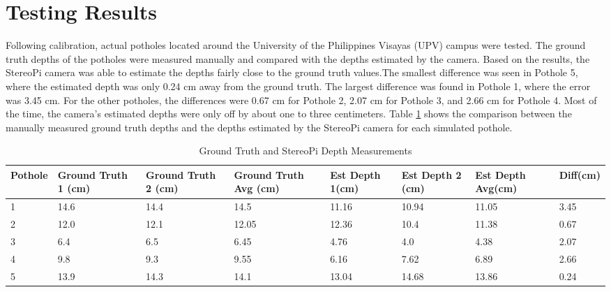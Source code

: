 \section{Testing Results}
Following calibration, actual potholes located around the University of the Philippines Visayas (UPV) campus were tested. The ground truth depths of the potholes were measured manually and compared with the depths estimated by the camera. Based on the results, the StereoPi camera was able to estimate the depths fairly close to the ground truth values.The smallest difference was seen in Pothole 5, where the estimated depth was only 0.24 cm away from the ground truth. The largest difference was found in Pothole 1, where the error was 3.45 cm. For the other potholes, the differences were 0.67 cm for Pothole 2, 2.07 cm for Pothole 3, and 2.66 cm for Pothole 4. Most of the time, the camera’s estimated depths were only off by about one to three centimeters. Table \ref{tab:comparison} shows the comparison between the manually measured ground truth depths and the depths estimated by the StereoPi camera for each simulated pothole.

\begin{table}[H]
	\centering
	\hspace{-2cm}
	\small 
	\caption{Ground Truth and StereoPi Depth Measurements}
	\begin{tabular}{|p{1.5cm}|p{1.5cm}|p{1.5cm}|p{1.5cm}|p{1.5cm}|p{1.5cm}|p{1.5cm}|p{1.5cm}|}
		\hline
		\textbf{Pothole} & \textbf{Ground Truth 1 (cm)} & \textbf{Ground Truth 2 (cm)} & \textbf{Ground Truth Avg (cm)} & \textbf{Est Depth 1(cm)} & \textbf{Est Depth 2 (cm)} & \textbf{Est Depth Avg(cm)} & \textbf{Diff(cm)} \\ \hline
		
		1 & 14.6 & 14.4 & 14.5 & 11.16 & 10.94 & 11.05 & 3.45  \\ \hline
		2 & 12.0 & 12.1 & 12.05 & 12.36 & 10.4 & 11.38 & 0.67 \\ \hline
		3 & 6.4 & 6.5 & 6.45 & 4.76 & 4.0 & 4.38 & 2.07 \\ \hline
		4 & 9.8 & 9.3 & 9.55 & 6.16 & 7.62 & 6.89 & 2.66 \\ \hline
		5 & 13.9 & 14.3 & 14.1 & 13.04 & 14.68 & 13.86 & 0.24 \\ \hline
		
	\end{tabular}
	\label{tab:comparison}
	\hspace{-3cm}
\end{table}

